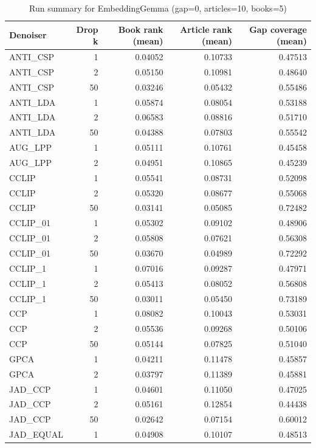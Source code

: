 \begin{table}
\caption{Run summary for EmbeddingGemma (gap=0, articles=10, books=5)}
\label{tab:summary_gap0_embeddinggemma_a10_b5}
\begin{tabular}{lrrrr}
\toprule
Denoiser & Drop k & Book rank (mean) & Article rank (mean) & Gap coverage (mean) \\
\midrule
ANTI\_CSP & 1 & 0.04052 & 0.10733 & 0.47513 \\
ANTI\_CSP & 2 & 0.05150 & 0.10981 & 0.48640 \\
ANTI\_CSP & 50 & 0.03246 & 0.05432 & 0.55486 \\
\hline
ANTI\_LDA & 1 & 0.05874 & 0.08054 & 0.53188 \\
ANTI\_LDA & 2 & 0.06583 & 0.08816 & 0.51710 \\
ANTI\_LDA & 50 & 0.04388 & 0.07803 & 0.55542 \\
\hline
AUG\_LPP & 1 & 0.05111 & 0.10761 & 0.45458 \\
AUG\_LPP & 2 & 0.04951 & 0.10865 & 0.45239 \\
\hline
CCLIP & 1 & 0.05541 & 0.08731 & 0.52098 \\
CCLIP & 2 & 0.05320 & 0.08677 & 0.55068 \\
CCLIP & 50 & 0.03141 & 0.05085 & 0.72482 \\
\hline
CCLIP\_01 & 1 & 0.05302 & 0.09102 & 0.48906 \\
CCLIP\_01 & 2 & 0.05808 & 0.07621 & 0.56308 \\
CCLIP\_01 & 50 & 0.03670 & 0.04989 & 0.72292 \\
\hline
CCLIP\_1 & 1 & 0.07016 & 0.09287 & 0.47971 \\
CCLIP\_1 & 2 & 0.05413 & 0.08052 & 0.56808 \\
CCLIP\_1 & 50 & 0.03011 & 0.05450 & 0.73189 \\
\hline
CCP & 1 & 0.08082 & 0.10043 & 0.53031 \\
CCP & 2 & 0.05536 & 0.09268 & 0.50106 \\
CCP & 50 & 0.05144 & 0.07825 & 0.51040 \\
\hline
GPCA & 1 & 0.04211 & 0.11478 & 0.45857 \\
GPCA & 2 & 0.03797 & 0.11389 & 0.45881 \\
\hline
JAD\_CCP & 1 & 0.04601 & 0.11050 & 0.47025 \\
JAD\_CCP & 2 & 0.05161 & 0.12854 & 0.44438 \\
JAD\_CCP & 50 & 0.02642 & 0.07154 & 0.60012 \\
\hline
JAD\_EQUAL & 1 & 0.04908 & 0.10107 & 0.48513 \\

\end{tabular}
\end{table}
